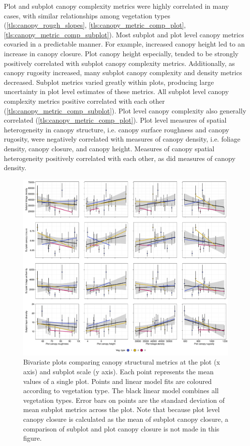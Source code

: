 \begin{refsection}
Plot and subplot canopy complexity metrics were highly correlated in many cases, with similar relationships among vegetation types (\autoref{tls:canopy_rough_slopes}, \autoref{tls:canopy_metric_comp_plot}, \autoref{tls:canopy_metric_comp_subplot}). Most subplot and plot level canopy metrics covaried in a predictable manner. For example, increased canopy height led to an increase in canopy closure. Plot canopy height especially, tended to be strongly positively correlated with subplot canopy complexity metrics. Additionally, as canopy rugosity increased, many subplot canopy complexity and density metrics decreased. Subplot metrics varied greatly within plots, producing large uncertainty in plot level estimates of these metrics. All subplot level canopy complexity metrics positive correlated with each other (\autoref{tls:canopy_metric_comp_subplot}). Plot level canopy complexity also generally correlated (\autoref{tls:canopy_metric_comp_plot}). Plot level measures of spatial heterogeneity in canopy structure, i.e. canopy surface roughness and canopy rugosity, were negatively correlated with measures of canopy density, i.e. foliage density, canopy closure, and canopy height. Measures of canopy spatial heterogeneity positively correlated with each other, as did measures of canopy density.

\begin{figure}
	\includegraphics[width=\linewidth]{img/plot_subplot_bivar}
	\caption[Bivariate plots comparing plot and subplot canopy complexity metrics]{Bivariate plots comparing canopy structural metrics at the plot (x axis) and subplot scale (y axis). Each point represents the mean values of a single plot. Points and linear model fits are coloured according to vegetation type. The black linear model combines all vegetation types. Error bars on points are the standard deviation of mean subplot metrics across the plot. Note that because plot level canopy closure is calculated as the mean of subplot canopy closure, a comparison of subplot and plot canopy closure is not made in this figure.}
	\label{tls:plot_subplot_bivar}
\end{figure}


\end{refsection}
